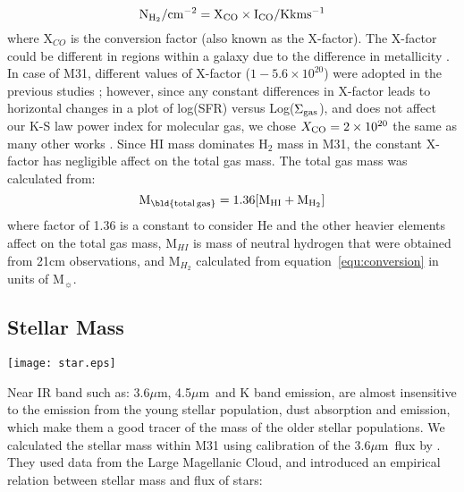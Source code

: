 \documentclass[useAMS,usenatbib]{mn2e}
\newcommand \um    {$\mu$m\ }
\begin{document}
\begin{equation}
\label{equ:conversion}
\rm N_{H_2}/\rm cm^{-2} = X_{CO} \times I_{CO}/\rm K km s^{-1}
\end{equation}
where X$_{CO}$ is the conversion factor (also known as the X-factor). The X-factor could be different in regions within a galaxy due to the difference in metallicity \citep{Wilson95, Bosselli02, Bolato13}. In case of M31, different values of X-factor ($1-5.6 \times 10^{20}$) were adopted in the previous studies \citep[e.g.][]{Ford13, Bolato13, Leroy11, Bolato08, Nieten06}; however, since any constant differences in X-factor leads to horizontal changes in a plot of log(SFR) versus Log($\Sigma_{\rm {gas}}$), and does not affect our K-S law power index for molecular gas,  we chose $X_{\rm {CO}}= 2 \times 10^{20}$  the same as many other works \citep[e.g.][]{Ford13, Smith12}. Since HI mass dominates H$_2$ mass in M31, the constant X-factor has negligible affect on the total gas mass. The total gas mass was calculated from:
\begin{equation}
\label{equ:total_gas}
\rm M_{\rm \bld {total \, gas}} = 1.36[M_{HI}+M_{H_2}]
\end{equation}
where  factor of 1.36 is a constant to consider He and the other heavier elements affect on the total gas mass, M$_{HI}$ is mass of neutral hydrogen that were obtained from 21cm observations, and M$_{H_2}$ calculated from equation~\ref{equ:conversion} in units of M$_{\sun}$.


\subsection{Stellar Mass}
\label{sec:starmass}
\begin{figure*}
\centering
\texttt{[image: star.eps]}
\caption{Stellar Mass surface density with pixel size of 4.3\arcsec and FWHM of 1\arcsec.7. The stellar surface density map is produced using IRAC 3.6~$\mu$m data and its calibration presented in equation~\ref{equ:eskew}.}
\label{fig:stellarmass}
\end{figure*}

Near IR band such as: 3.6$\mu$m, 4.5\um and K band emission, are almost insensitive to the emission from the young stellar population, dust absorption and emission, which make them a good tracer of the mass of the older stellar populations\citep[e.g.,][]{Elmgreen84, Eskew12, Zhu10}. We calculated the stellar mass within M31 using calibration of the 3.6\um flux by \cite{Eskew12}. They used data from the Large Magellanic Cloud, and introduced an empirical relation between stellar mass and flux of stars:
\end{document}
